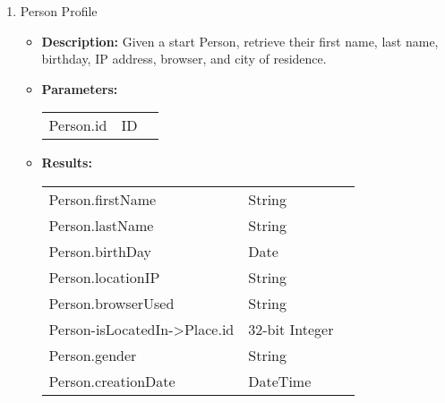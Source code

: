 \begin{enumerate}

  \item Person Profile
    \begin{itemize}
      \item \textbf{Description:}
        Given a start Person, retrieve their first name, last name, birthday, IP address, browser, and city of residence.
      \item \textbf{Parameters:} \\
        \begin{tabular}{lll}
          Person.id 										& ID \\
        \end{tabular}
      \item \textbf{Results:} \\
        \begin{tabular}{lll}
          Person.firstName									& String \\
          Person.lastName										& String \\
          Person.birthDay										& Date \\
          Person.locationIP									& String \\
          Person.browserUsed								& String \\
          Person-isLocatedIn->Place.id			& 32-bit Integer \\
          Person.gender									    & String \\
          Person.creationDate						    & DateTime \\
        \end{tabular}
    \end{itemize}


\end{enumerate}
